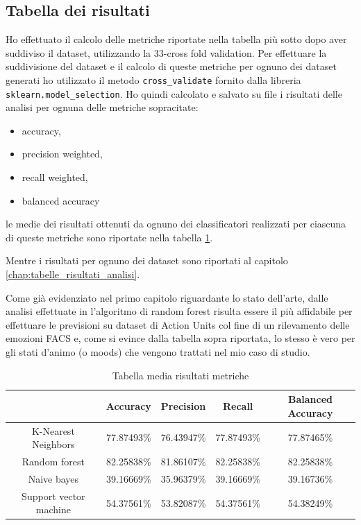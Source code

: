\subsection{Tabella dei risultati}
Ho effettuato il calcolo delle metriche riportate nella tabella più sotto dopo aver suddiviso il dataset, utilizzando la 33-cross fold validation.
Per effettuare la suddivisione del dataset e il calcolo di queste metriche per ognuno dei dataset generati ho utilizzato il metodo \texttt{cross_validate} fornito dalla libreria \texttt{sklearn.model_selection}.
Ho quindi calcolato e salvato su file i risultati delle analisi per ognuna delle metriche sopracitate:
\begin{itemize}
    \item accuracy,
    \item precision weighted,
    \item recall weighted, 
    \item balanced accuracy
\end{itemize}
le medie dei risultati ottenuti da ognuno dei classificatori realizzati per ciascuna di queste metriche sono riportate nella tabella \ref{tab:1}.

Mentre i risultati per ognuno dei dataset sono riportati al capitolo \ref{chap:tabelle_risultati_analisi}.

Come già evidenziato nel primo capitolo riguardante lo stato dell’arte, dalle analisi effettuate in \cite{FaceExpreRecoImgSeqTwoFoldRandomForestClass} l’algoritmo di random forest risulta essere il più affidabile per effettuare le previsioni su dataset di Action Units col fine di un rilevamento delle emozioni FACS e, come si evince dalla tabella sopra riportata, lo stesso è vero per gli stati d’animo (o moods) che vengono trattati nel mio caso di studio.

\begin{table}
    \small %
    \caption{Tabella media risultati metriche}
    \label{tab:1}
    \begin{tabular}{ |c||c|c|c|c| } 
         \hline
          & Accuracy & Precision & Recall & Balanced Accuracy\\ 
         \hline\hline
         K-Nearest Neighbors& 77.87493\% & 76.43947\% & 77.87493\% & 77.87465\%\\
         \hline
         Random forest & 82.25838\% & 81.86107\% & 82.25838\% & 82.25838\%\\
         \hline
         Naive bayes& 39.16669\% & 35.96379\% & 39.16669\% & 39.16736\%\\
         \hline
         Support vector machine& 54.37561\% & 53.82087\% & 54.37561\% & 54.38249\%\\
         \hline
    \end{tabular}
\end{table}

